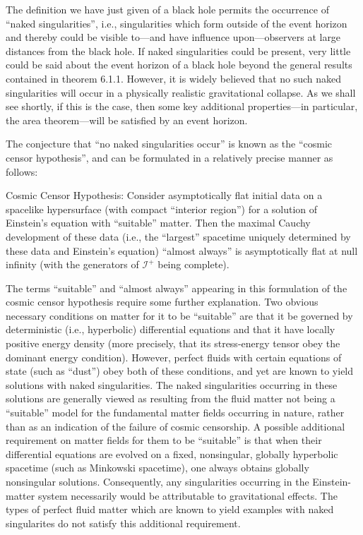 \documentclass[11pt,a4paper]{article}
\begin{document}
The definition we have just given of a black hole permits the occurrence of ``naked singularities'', i.e., singularities which form outside of the event horizon and thereby could be visible to---and have influence upon---observers at large distances from the black hole. If naked singularities could be present, very little could be said about the event horizon of a black hole beyond the general results contained in theorem 6.1.1. However, it is widely believed that no such naked singularities will occur in a physically realistic gravitational collapse. As we shall see shortly, if this is the case, then some key additional properties---in particular, the area theorem---will be satisfied by an event horizon.

The conjecture that ``no naked singularities occur'' is known as the ``cosmic censor hypothesis'', and can be formulated in a relatively precise manner as follows:

Cosmic Censor Hypothesis: Consider asymptotically flat initial data on a spacelike hypersurface (with compact ``interior region'') for a solution of Einstein's equation with ``suitable'' matter. Then the maximal Cauchy development of these data (i.e., the ``largest'' spacetime uniquely determined by these data and Einstein's equation) ``almost always'' is asymptotically flat at null infinity (with the generators of \(\mathscr I^+\) being complete).

\hypertarget{source-149}{}

The terms ``suitable'' and ``almost always'' appearing in this formulation of the cosmic censor hypothesis require some further explanation. Two obvious necessary conditions on matter for it to be ``suitable'' are that it be governed by deterministic (i.e., hyperbolic) differential equations and that it have locally positive energy density (more precisely, that its stress-energy tensor obey the dominant energy condition). However, perfect fluids with certain equations of state (such as ``dust'') obey both of these conditions, and yet are known to yield solutions with naked singularities. The naked singularities occurring in these solutions are generally viewed as resulting from the fluid matter not being a ``suitable'' model for the fundamental matter fields occurring in nature, rather than as an indication of the failure of cosmic censorship. A possible additional requirement on matter fields for them to be ``suitable'' is that when their differential equations are evolved on a fixed, nonsingular, globally hyperbolic spacetime (such as Minkowski spacetime), one always obtains globally nonsingular solutions. Consequently, any singularities occurring in the Einstein-matter system necessarily would be attributable to gravitational effects. The types of perfect fluid matter which are known to yield examples with naked singularites do not satisfy this additional requirement.
\end{document}
